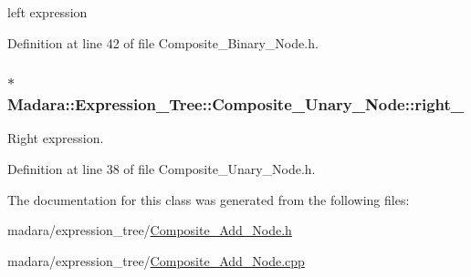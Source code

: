 left expression 



Definition at line 42 of file Composite\_\-Binary\_\-Node.h.

\hypertarget{classMadara_1_1Expression__Tree_1_1Composite__Unary__Node_a077b7bd1b52df6f5c6adfde735556a68}{
\subsubsection[{right\_\-}]{$\ast$ {\bf Madara::Expression\_\-Tree::Composite\_\-Unary\_\-Node::right\_\-}}}
\label{d3/dc7/classMadara_1_1Expression__Tree_1_1Composite__Unary__Node_a077b7bd1b52df6f5c6adfde735556a68}


Right expression. 



Definition at line 38 of file Composite\_\-Unary\_\-Node.h.



The documentation for this class was generated from the following files:\begin{DoxyCompactItemize}
\item 
madara/expression\_\-tree/\hyperlink{Composite__Add__Node_8h}{Composite\_\-Add\_\-Node.h}\item 
madara/expression\_\-tree/\hyperlink{Composite__Add__Node_8cpp}{Composite\_\-Add\_\-Node.cpp}\end{DoxyCompactItemize}
